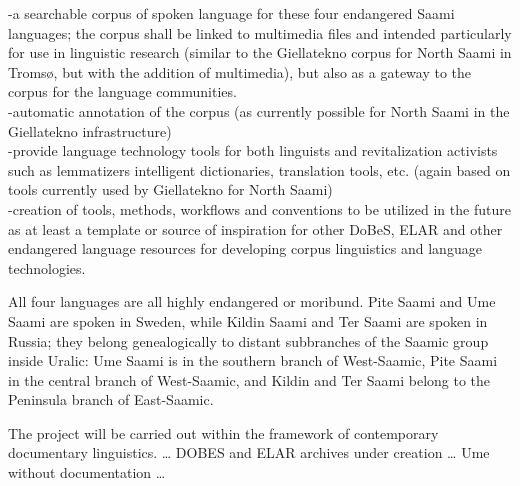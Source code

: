 \documentclass[a4paper,12pt]{article}
\begin{document}
-a searchable corpus of spoken language for these four endangered Saami languages; the corpus shall be linked to multimedia files and intended particularly for use in linguistic research (similar to the Giellatekno corpus for North Saami in Tromsø, but with the addition of multimedia), but also as a gateway to the corpus for the language communities.\\
-automatic annotation of the corpus (as currently possible for North Saami in the Giellatekno infrastructure)\\
-provide language technology tools for both linguists and revitalization activists such as lemmatizers %
intelligent dictionaries, translation tools, etc. (again based on tools currently used by Giellatekno for North Saami)\\
-creation of tools, methods, workflows and conventions to be utilized in the future as at least a template or source of inspiration for other DoBeS, ELAR and other endangered language resources for developing corpus linguistics and language technologies.


All four languages are all highly endangered or moribund. Pite Saami and Ume Saami are spoken in Sweden, while Kildin Saami and Ter Saami are spoken in Russia; they belong genealogically to distant subbranches of the Saamic group inside Uralic: Ume Saami is in the southern branch of West-Saamic, Pite Saami in the central branch of West-Saamic, and Kildin and Ter Saami belong to the Peninsula branch of East-Saamic.

The project will be carried out within the framework of contemporary documentary linguistics. 
 … DOBES and ELAR archives under creation … Ume without documentation …
\end{document}

